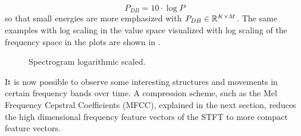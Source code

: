 \begin{equation}\label{eq:signal_spec_log}
  P_{DB} = 10 \cdot \log{P}
\end{equation}
so that small energies are more emphasized with $P_{DB} \in \mathbb{R}^{K \times M}$. 
The same examples with log scaling in the value space visualized with log scaling of the frequency space in the plots are shown in .
\begin{figure}[!ht]
  \centering
  \caption{Spectrogram logarithmic scaled.}
  \label{fig:signal_spec_log_showcase}
\end{figure}
\FloatBarrier
\noindent
It is now possible to observe some interesting structures and movements in certain frequency bands over time.
A compression scheme, such as the Mel Frequency Cepstral Coefficients (MFCC), explained in the next section, reduces the high dimensional frequency feature vectors of the STFT to more compact feature vectors.